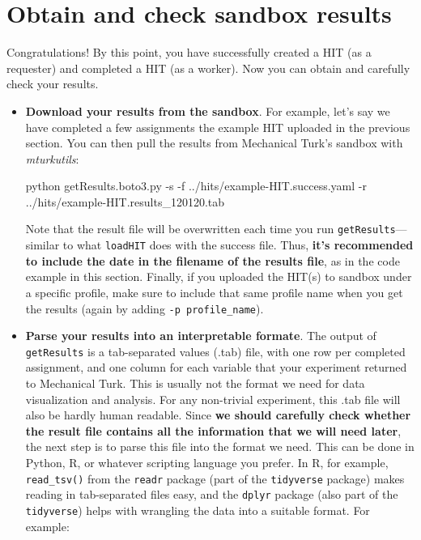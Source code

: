 \documentclass{article}
\newenvironment{code}%
   {\par\noindent\adjustbox{margin=1ex,bgcolor=shadecolor,margin=0ex \medskipamount}\bgroup\minipage\linewidth\verbatim}%
   {\endverbatim\endminipage\egroup}
\begin{document}
\section{Obtain and check sandbox results}

Congratulations! By this point, you have successfully created a HIT (as a requester) and completed a HIT (as a worker). Now you can obtain and carefully check your results. 


\begin{itemize}
  \item {\bf Download your results from the sandbox}. For example, let's say we have completed a few assignments the example HIT uploaded in the previous section. You can then pull the results from Mechanical Turk's sandbox with {\em mturkutils}: 

\begin{code}
python getResults.boto3.py -s -f ../hits/example-HIT.success.yaml 
  -r ../hits/example-HIT.results_120120.tab
\end{code}

Note that the result file will be overwritten each time you run \texttt{getResults}---similar to what \texttt{loadHIT} does with the success file. Thus, \textbf{it's recommended to include the date in the filename of the results file}, as in the code example in this section. Finally, if you uploaded the HIT(s) to sandbox under a specific profile, make sure to include that same profile name when you get the results (again by adding \texttt{-p profile\_name}).

  \item \textbf{Parse your results into an interpretable formate}. The output of \texttt{getResults} is a tab-separated values (.tab) file, with one row per completed assignment, and one column for each variable that your experiment returned to Mechanical Turk. This is usually not the format we need for data visualization and analysis. For any non-trivial experiment, this .tab file will also be hardly human readable. Since \textbf{we should carefully check whether the result file contains all the information that we will need later}, the next step is to parse this file into the format we need. This can be done in Python, R, or whatever scripting language you prefer. In R, for example, \texttt{read\_tsv()} from the \texttt{readr} package (part of the \texttt{tidyverse} package) makes reading in tab-separated files easy, and the \texttt{dplyr} package (also part of the \texttt{tidyverse}) helps with wrangling the data into a suitable format.  For example:
  

\end{itemize}
\end{document}
